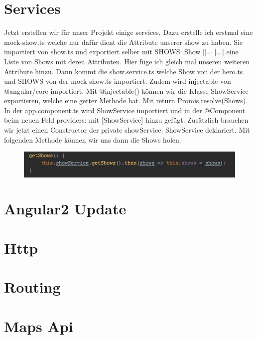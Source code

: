 \documentclass[12pt,titlepage]{article}
\begin{document}
\newpage
\section{Services}
Jetzt erstellen wir für unser Projekt einige services. Dazu erstelle ich erstmal eine mock-show.ts welche nur dafür dient die Attribute unserer show zu haben. Sie importiert von show.ts und exportiert selber mit SHOWS: Show []= [...] eine Liste von Shows mit deren Attributen. Hier füge ich gleich mal unseren weiteren Attribute hinzu. Dann kommt die show.service.ts welche Show von der hero.ts und SHOWS von der mock-show.ts importiert. Zudem wird injectable von @angular/core importiert. Mit @injectable() können wir die Klasse ShowService exportieren, welche eine getter Methode hat. Mit return Promis.resolve(Shows). In der app.component.ts wird ShowService importiert und in der @Component beim neuen Feld providers: mit [ShowService] hinzu gefügt. Zusätzlich brauchen wir jetzt einen Constructor der private showService: ShowService deklariert. Mit folgenden Methode können wir uns dann die Shows holen.

\begin{figure}[h]
\begin{center}
\includegraphics[scale=1.2]{links/getShows.jpg}
\label{scene_intro_scale}
\end{center}
\end{figure}

\newpage
\section{Angular2 Update}

\newpage
\section{Http}

\newpage
\section{Routing}

\newpage
\section{Maps Api}
\end{document}
